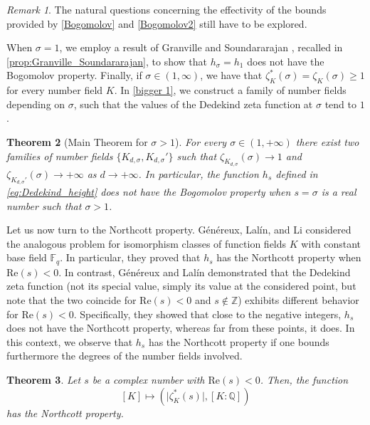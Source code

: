 \documentclass[10pt,a4paper]{amsart}
\theoremstyle{plain}
\newtheorem{theorem}{Theorem}[section]
\theoremstyle{definition}
\theoremstyle{remark}
\newtheorem{remark}[theorem]{Remark}
\newcommand{\F}{\mathbb{F}}
\begin{document}
\begin{remark}
The natural questions concerning the effectivity of the bounds provided by \cref{Bogomolov} and \cref{Bogomolov2} still have to be explored.
\end{remark}

When $\sigma = 1$, we employ a result of Granville and Soundararajan \cite{Granville_Soundararajan_2003}, recalled in \cref{prop:Granville_Soundararajan}, to show that $h_\sigma = h_1$ does not have the Bogomolov property.
Finally, if $\sigma \in (1,\infty)$, we have that $\zeta_K^\ast(\sigma) = \zeta_K(\sigma) \geq 1$ for every number field $K$. In \cref{bigger 1}, we construct a family of number fields depending on $\sigma$, such that the values of the Dedekind zeta function at $\sigma$ tend to $1$.

\begin{theorem}[Main Theorem for $\sigma > 1$]\label{s>1}
        For every $\sigma \in (1,+\infty)$ there exist two families of number fields $\{ K_{d,\sigma}, K_{d,\sigma}' \}$ such that $\zeta_{K_{d,\sigma}}(\sigma) \to 1$ and $\zeta_{K_{d,\sigma}'}(\sigma) \to +\infty$ as $d \to +\infty$. In particular, the function $h_s$ defined in \eqref{eq:Dedekind_height} does not have the Bogomolov property when $s = \sigma$ is a real number such that $\sigma > 1$.
    \end{theorem}

Let us now turn to the Northcott property. G\'en\'ereux, Lalín, and Li \cite{GeLaLi22} considered the analogous problem for isomorphism classes of function fields $K$ with constant base field $\F_q$. In particular, they proved that $h_s$ has the Northcott property when $\mathrm{Re}(s)<0$. In contrast, G\'en\'ereux and Lalín \cite{GeLa24} demonstrated that the Dedekind zeta function (not its special value, simply its value at the considered point, but note that the two coincide for $\mathrm{Re}(s) < 0$ and $s \not\in \mathbb{Z}$) exhibits different behavior for $\mathrm{Re}(s)<0$. Specifically, they showed that close to the negative integers, $h_s$ does not have the Northcott property, whereas far from these points, it does. In this context, we observe that $h_s$ has the Northcott property if one bounds furthermore the degrees of the number fields involved.

\begin{theorem}\label{Re negative}
Let $s$ be a complex number with $\mathrm{Re}(s)< 0$. Then, the function
\[
[K]\mapsto \left(\lvert\zeta_K^\ast(s) \rvert, [K \colon \mathbb{Q}] \right)
\]
has the Northcott property.
\end{theorem}
\end{document}
